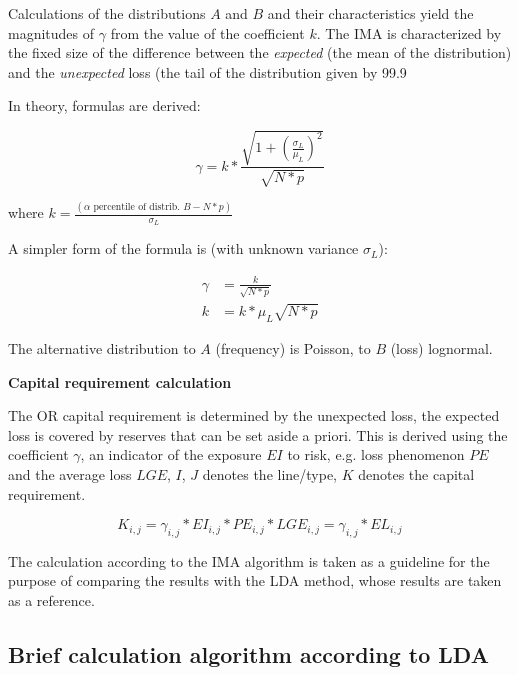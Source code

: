 \documentclass{article}
\begin{document}
Calculations of the distributions $A$ and $B$ and their characteristics yield the magnitudes of $\gamma$ from the value of the coefficient $k$. The IMA is characterized by the fixed size of the difference between the \emph{expected} (the mean of the distribution) and the \emph{unexpected} loss (the tail of the distribution given by 99.9%

In theory, formulas are derived:

\begin{equation}
  \gamma = k * \frac{\sqrt{1 + (\frac{\sigma_L}{\mu_L})^2}}{\sqrt{N * p}}
\end{equation}

where $k = \frac{(\alpha \textrm{ percentile of distrib.  } B - N * p)}{\sigma_L}$

A simpler form of the formula is (with unknown variance $\sigma_L$):

\begin{equation}
  \begin{aligned}
  \gamma &= \frac{k}{\sqrt{N * p}} \\
       k &= k * \mu_L \sqrt{N * p}
  \end{aligned}
\end{equation}

The alternative distribution to $A$ (frequency) is Poisson, to $B$ (loss) lognormal.

\textbf{Capital requirement calculation}

The OR capital requirement is determined by the unexpected loss, the expected loss is covered by reserves that can be set aside a priori. This is derived using the coefficient $\gamma$, an indicator of the exposure $EI$ to risk, e.g. loss phenomenon $PE$ and the average loss $LGE$, $I$, $J$ denotes the line/type, $K$ denotes the capital requirement.

\begin{equation}
  K_{i,j} = \gamma_{i,j} * EI_{i,j} * PE_{i,j} * LGE_{i,j} = \gamma_{i,j} * EL_{i,j}
\end{equation}


The calculation according to the IMA algorithm is taken as a guideline for the purpose of comparing the results with the LDA method, whose results are taken as a reference.

\subsection{Brief calculation algorithm according to LDA}
\end{document}

